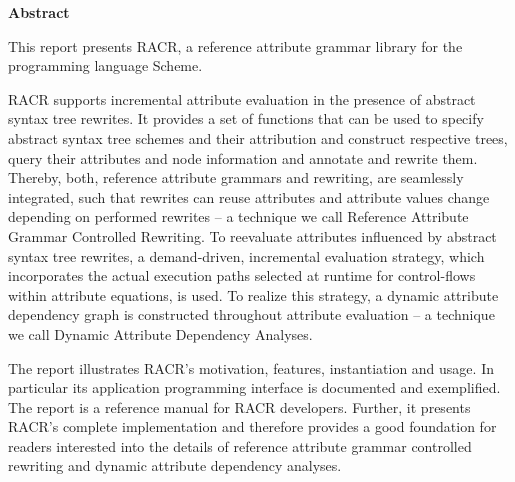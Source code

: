 \cleardoublepage\thispagestyle{empty}
\begin{center}{\bfseries Abstract}\end{center}
\begin{onehalfspace}
This report presents RACR, a reference attribute grammar library for the programming language Scheme.

\vspace{7pt}

RACR supports incremental attribute evaluation in the presence of abstract syntax tree rewrites. It
provides a set of functions that can be used to specify abstract syntax tree schemes and their
attribution and construct respective trees, query their attributes and node information and annotate
and rewrite them. Thereby, both, reference attribute grammars and rewriting, are seamlessly integrated,
such that rewrites can reuse attributes and attribute values change depending on performed rewrites –
a technique we call Reference Attribute Grammar Controlled Rewriting. To reevaluate attributes
influenced by abstract syntax tree rewrites, a demand-driven, incremental evaluation strategy, which
incorporates the actual execution paths selected at runtime for control-flows within attribute
equations, is used. To realize this strategy, a dynamic attribute dependency graph is constructed
throughout attribute evaluation – a technique we call Dynamic Attribute Dependency Analyses.

\vspace{7pt}

The report illustrates RACR's motivation, features, instantiation and usage. In particular its
application programming interface is documented and exemplified. The report is a reference manual for
RACR developers. Further, it presents RACR’s complete implementation and therefore provides a good
foundation for readers interested into the details of reference attribute grammar controlled rewriting
and dynamic attribute dependency analyses.
\end{onehalfspace}
\vfill\null